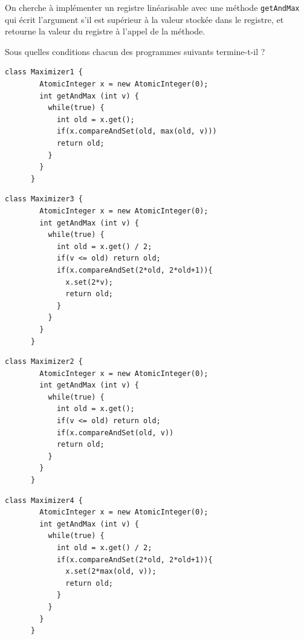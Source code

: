 
\begingroup

\begin{exercice}[Vivacité]
  On cherche à implémenter un registre linéarisable avec une méthode \lstinline{getAndMax}
  qui écrit l'argument s'il est supérieur à la valeur stockée dans le registre, et retourne
  la valeur du registre à l'appel de la méthode.
  \begin{questions}
  \item Sous quelles conditions chacun des programmes suivants termine-t-il ? 
  \end{questions}

  \begin{minipage}{.47\textwidth}
    \begin{lstlisting}[gobble=6]
      class Maximizer1 {
        AtomicInteger x = new AtomicInteger(0);
        int getAndMax (int v) {
          while(true) {
            int old = x.get();
            if(x.compareAndSet(old, max(old, v)))
            return old;
          }
        }
      }

    \end{lstlisting}
    \begin{lstlisting}[gobble=6]
      class Maximizer3 {
        AtomicInteger x = new AtomicInteger(0);
        int getAndMax (int v) {
          while(true) { 
            int old = x.get() / 2;
            if(v <= old) return old;
            if(x.compareAndSet(2*old, 2*old+1)){
              x.set(2*v);
              return old;
            }
          }
        }
      }
    \end{lstlisting}
  \end{minipage}
  \hspace{\fill}
  \begin{minipage}{.47\textwidth}
    \begin{lstlisting}[gobble=6]
      class Maximizer2 {
        AtomicInteger x = new AtomicInteger(0);
        int getAndMax (int v) {
          while(true) {
            int old = x.get();
            if(v <= old) return old;
            if(x.compareAndSet(old, v))
            return old;
          }
        }
      }
    \end{lstlisting}
    \begin{lstlisting}[gobble=6]
      class Maximizer4 {
        AtomicInteger x = new AtomicInteger(0);
        int getAndMax (int v) {
          while(true) { 
            int old = x.get() / 2;
            if(x.compareAndSet(2*old, 2*old+1)){
              x.set(2*max(old, v));
              return old;
            }
          }
        }
      }

    \end{lstlisting}
  \end{minipage}  
\end{exercice}

\endgroup
\endinput
